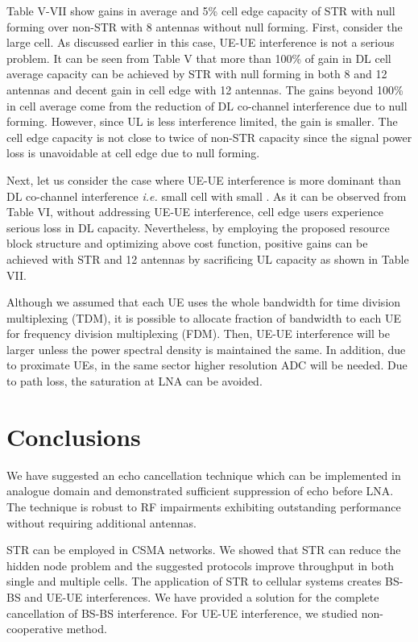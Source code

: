 \documentclass[twocolumn]{IEEEtran}
\begin{document}
Table V-VII show gains in average and 5\% cell edge capacity of STR
with null forming over non-STR with 8 antennas without null forming.
First, consider the large cell. As discussed earlier in this case,
UE-UE interference is not a serious problem. It can be seen from
Table V that more than 100\% of gain in DL cell average capacity can
be achieved by STR with null forming in both 8 and 12 antennas and
decent gain in cell edge with 12 antennas. The gains beyond 100\% in
cell average come from the reduction of DL co-channel interference
due to null forming. However, since UL is less interference limited,
the gain is smaller. The cell edge capacity is not close to twice of
non-STR capacity since the signal power loss is unavoidable at cell
edge due to null forming.

Next, let us consider the case where UE-UE interference is more
dominant than DL co-channel interference \emph{i.e.} small cell with
small . As it can be observed from Table VI, without addressing
UE-UE interference, cell edge users experience serious loss in DL
capacity. Nevertheless, by employing the proposed resource block
structure and optimizing above cost function, positive gains can be
achieved with STR and 12 antennas by sacrificing UL capacity as
shown in Table VII.


Although we assumed that each UE uses the whole bandwidth for time
division multiplexing (TDM), it is possible to allocate fraction of
bandwidth to each UE for frequency division multiplexing (FDM).
Then, UE-UE interference will be larger unless the power spectral
density is maintained the same. In addition, due to proximate UEs,
in the same sector higher resolution ADC will be needed. Due to path
loss, the saturation at LNA can be avoided.



\section{Conclusions}

We have suggested an echo cancellation technique which can be
implemented in analogue domain and demonstrated sufficient
suppression of echo before LNA. The technique is robust to RF
impairments exhibiting outstanding performance without requiring
additional antennas.

STR can be employed in CSMA networks. We showed that STR can reduce
the hidden node problem and the suggested protocols improve
throughput in both single and multiple cells. The application of STR
to cellular systems creates BS-BS and UE-UE interferences. We have
provided a solution for the complete cancellation of BS-BS
interference. For UE-UE interference, we studied non-cooperative
method.
\end{document}
